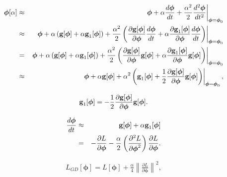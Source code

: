 \documentclass[letterpaper,twoside,openany, titlepage,oldfontcommands,titles,dvipsnames]{memoir}
\begin{document}
\begin{eqnarray}
 \boldsymbol\phi[\alpha] &\approx& \left.\boldsymbol\phi + \alpha \frac{d\boldsymbol\phi}{dt} + \frac{\alpha^2}{2}\frac{d^2\boldsymbol\phi }{dt^2}\right|_{\boldsymbol\phi=\boldsymbol\phi_{0}}\nonumber \\
  &\approx& \left.\boldsymbol\phi + \alpha \left(\mbox{\bf g}[\boldsymbol\phi] +\alpha \mbox{\bf g}_{1}[\boldsymbol\phi] \right) + \frac{\alpha^2}{2}\left(\frac{\partial \mbox{\bf g}[\boldsymbol\phi]}{\partial \boldsymbol\phi}\frac{d\boldsymbol\phi}{dt} +\alpha \frac{\partial \mbox{\bf g}_{1}[\boldsymbol\phi]}{\partial \boldsymbol\phi}\frac{d\boldsymbol\phi}{dt}\right)\right|_{\boldsymbol\phi=\boldsymbol\phi_{0}}\nonumber \\
  &=& \left.\boldsymbol\phi + \alpha \left(\mbox{\bf g}[\boldsymbol\phi] +\alpha \mbox{\bf g}_{1}[\boldsymbol\phi]\right) + \frac{\alpha^2}{2}\left(\frac{\partial \mbox{\bf g}[\boldsymbol\phi]}{\partial \boldsymbol\phi}\mbox{\bf g}[\boldsymbol\phi] +\alpha \frac{\partial \mbox{\bf g}_{1}[\boldsymbol\phi]}{\partial \boldsymbol\phi}\mbox{\bf g}[\boldsymbol\phi]\right)\right|_{\boldsymbol\phi=\boldsymbol\phi_{0}}\nonumber \\
  &\approx& \left.\boldsymbol\phi + \alpha \mbox{\bf g}[\boldsymbol\phi] + \alpha^2\left(\mbox{\bf g}_{1}[\boldsymbol\phi] +\frac{1}{2}\frac{\partial \mbox{\bf g}[\boldsymbol\phi]}{\partial \boldsymbol\phi}\mbox{\bf g}[\boldsymbol\phi]\right)\right|_{\boldsymbol\phi=\boldsymbol\phi_{0}},
 \end{eqnarray}

\begin{eqnarray}
 \mbox{\bf g}_{1}[\boldsymbol\phi] = -\frac{1}{2}\frac{\partial \mbox{\bf g}[\boldsymbol\phi]}{\partial \boldsymbol\phi}\mbox{\bf g}[\boldsymbol\phi].
 \end{eqnarray}

\begin{eqnarray}\label{eq:reg_imp_proof1}
 \frac{d\boldsymbol\phi}{dt} &\approx& \mbox{\bf g}[\boldsymbol\phi] +\alpha \mbox{\bf g}_{1}[\boldsymbol\phi] \nonumber \\
 &=& -\frac{\partial L}{\partial \boldsymbol\phi}-\frac{\alpha}{2}\left(\frac{\partial^2 L}{\partial \boldsymbol\phi^2}\right)\frac{\partial L}{\partial \boldsymbol\phi}.
 \end{eqnarray}

\begin{eqnarray}\label{eq:reg_imp_proof2}
 L_{GD}[\boldsymbol\phi] = L[\boldsymbol\phi] + \frac{\alpha}{4} \left\lVert\frac{\partial L}{\partial \boldsymbol\phi} \right\rVert^{2},
 \end{eqnarray}
\end{document}
